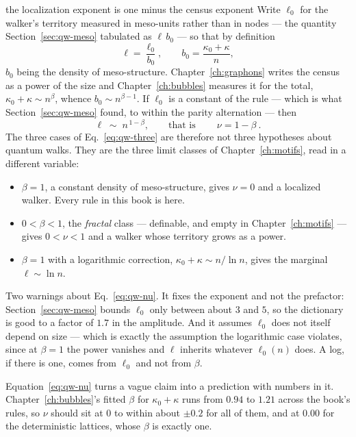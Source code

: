 \begin{calculation}{the localization exponent is one minus the census exponent}
Write $\ell_0$ for the walker's territory measured in meso-units rather than in nodes
--- the quantity Section~\ref{sec:qw-meso} tabulated as $\ell\,b_0$ --- so that by
definition
\begin{equation}
  \ell = \frac{\ell_0}{b_0}, \qquad b_0 = \frac{\kappa_0+\kappa}{n},
  \label{eq:qw-ell0}
\end{equation}
$b_0$ being the density of meso-structure. Chapter~\ref{ch:graphons} writes the
census as a power of the size and Chapter~\ref{ch:bubbles} measures it for the total,
$\kappa_0+\kappa \sim n^{\beta}$, whence $b_0\sim n^{\beta-1}$. If $\ell_0$ is a
constant of the rule --- which is what Section~\ref{sec:qw-meso} found, to within the
parity alternation --- then
\begin{equation}
  \ell \;\sim\; n^{\,1-\beta}, \qquad\text{that is}\qquad
  \boxed{\ \nu = 1-\beta\ }.
  \label{eq:qw-nu}
\end{equation}
The three cases of Eq.~\eqref{eq:qw-three} are therefore not three hypotheses about
quantum walks. They are the three limit classes of Chapter~\ref{ch:motifs}, read in a
different variable:
\begin{itemize}
  \item $\beta=1$, a constant density of meso-structure, gives $\nu=0$ and a
    localized walker. Every rule in this book is here.
  \item $0<\beta<1$, the \emph{fractal} class --- definable, and empty in
    Chapter~\ref{ch:motifs} --- gives $0<\nu<1$ and a walker whose territory
    grows as a power.
  \item $\beta=1$ with a logarithmic correction, $\kappa_0+\kappa\sim n/\ln n$, gives
    the marginal $\ell\sim\ln n$.
\end{itemize}
Two warnings about Eq.~\eqref{eq:qw-nu}. It fixes the exponent and not the
prefactor: Section~\ref{sec:qw-meso} bounds $\ell_0$ only between about $3$ and $5$,
so the dictionary is good to a factor of $1.7$ in the amplitude. And it assumes
$\ell_0$ does not itself depend on size --- which is exactly the assumption the
logarithmic case violates, since at $\beta=1$ the power vanishes and $\ell$ inherits
whatever $\ell_0(n)$ does. A log, if there is one, comes from $\ell_0$ and not from
$\beta$.
\end{calculation}

Equation~\eqref{eq:qw-nu} turns a vague claim into a prediction with numbers in
it. Chapter~\ref{ch:bubbles}'s fitted $\beta$ for $\kappa_0+\kappa$ runs from $0.94$
to $1.21$ across the book's rules, so $\nu$ should sit at $0$ to within about
$\pm0.2$ for all of them, and at $0.00$ for the deterministic lattices, whose $\beta$
is exactly one.

